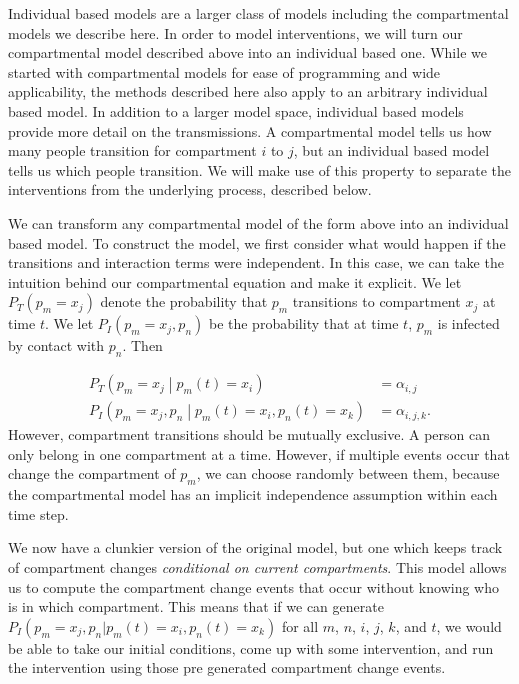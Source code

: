 \documentclass{article}
\begin{document}

Individual based models are a larger class of models including the compartmental models we describe here.  In order to model interventions, we will turn our compartmental model described above into an individual based one.  While we started with compartmental models for ease of programming and wide applicability, the methods described here also apply to an arbitrary individual based model. %
In addition to a larger model space, individual based models provide more detail on the transmissions. A compartmental model tells us how many people transition for compartment $i$ to $j$, but an individual based model tells us which people transition.  We will make use of this property to separate the interventions from the underlying process, described below.

We can transform any compartmental model of the form above into an individual based model.  To construct the model, we first consider what would happen if the transitions and interaction terms were independent.  In this case, we can take the intuition behind our compartmental equation and make it explicit.  We let $P_T(p_m = x_j)$ denote the probability that $p_m$ transitions to compartment $x_j$ at time $t$.  We let $P_I(p_m = x_j , p_n)$ be the probability that  at time $t$, $p_m$ is infected by contact with $p_n$.  Then

\begin{align*}
   P_T\left(p_m = x_j \middle| p_m(t) = x_i\right) &= \alpha_{i,j}
\\ P_I\left(p_m = x_j ,p_n \middle| p_m(t) = x_i, p_n(t) = x_k \right) &= \alpha_{i,j,k}.
\end{align*}
However, compartment transitions should be mutually exclusive.  A person can only belong in one compartment at a time.  However, if multiple events occur that change the compartment of $p_m$, we can choose randomly between them, because the compartmental model has an implicit independence assumption within each time step.

We now have a clunkier version of the original model, but one which keeps track of compartment changes \emph{conditional on current compartments}.  This model allows us to compute the compartment change events that occur without knowing who is in which compartment.  This means that if we can generate $P_I(p_m = x_j ,p_n | p_m(t) = x_i, p_n(t) = x_k)$ for all $m$, $n$, $i$, $j$, $k$, and $t$, we would be able to take our initial conditions, come up with some intervention, and run the intervention using those pre generated compartment change events.
\end{document}
